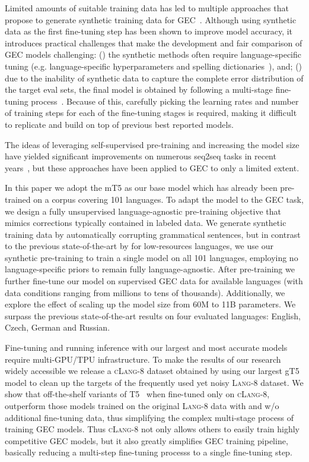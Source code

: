 \documentclass[11pt,a4paper]{article}
\newcommand{\GT}[0]{{gT5}\xspace}
\newcommand{\lang}[0]{{\scshape Lang-8}\xspace}
\newcommand{\clangg}[0]{{\scshape cLang-8}\xspace}
\begin{document}
Limited amounts of suitable training data has led to multiple approaches that propose to generate synthetic training data for GEC~\cite{madnani2012exploring,grundkiewicz2014wiked,grundkiewicz-etal-2019-neural,lichtarge-etal-2019-corpora,awasthi-etal-2019-parallel}.
Although using synthetic data as the first fine-tuning step has been shown to improve model accuracy, it introduces practical challenges that make the development and fair comparison of GEC models challenging: () the synthetic methods often require language-specific tuning (e.g. language-specific hyperparameters and spelling dictionaries~\cite{naplava}), and; () due to the inability of synthetic data to capture the complete error distribution of the target eval sets, the final model is obtained by following a multi-stage fine-tuning process~\cite{lichtarge-etal-2019-corpora,lichtarge-etal-2020-data,omelianchuk-etal-2020-gector}. 
Because of this, carefully picking the learning rates and number of training steps for each of the fine-tuning stages is required, making it difficult to replicate and build on top of previous best reported models.

The ideas of leveraging self-supervised pre-training and increasing the model size have yielded significant improvements on numerous seq2seq tasks in recent years~\cite{t5,mt5,BART,MASS,KERMIT,Bert2Bert}, but these approaches have been applied to GEC to only a limited extent.

In this paper we adopt the mT5 \citep{mt5} as our base model which has already been pre-trained on a corpus covering 101 languages.
To adapt the model to the GEC task, we design a fully unsupervised language-agnostic pre-training objective that mimics corrections typically contained in labeled data.
We generate synthetic training data by automatically corrupting grammatical sentences, but in contrast to the previous state-of-the-art by \citet{naplava} for low-resources languages, we use our synthetic pre-training to train a single model on all 101 languages, employing no language-specific priors to remain fully language-agnostic.  After pre-training we further fine-tune our model on supervised GEC data for available languages (with data conditions ranging from millions to tens of thousands).
Additionally, we explore the effect of scaling up the model size from 60M to 11B parameters. We surpass the previous state-of-the-art results on four evaluated languages: English, Czech, German and Russian.

Fine-tuning and running inference with our largest and most accurate models require multi-GPU/TPU infrastructure. To make the results of our research widely accessible we release a \clangg dataset obtained by using our largest \GT model to clean up the targets of the frequently used yet noisy \lang dataset. We show that off-the-shelf variants of T5~\cite{t5} when fine-tuned only on \clangg, outperform those models trained on the original \lang data with and w/o additional fine-tuning data, thus simplifying the complex multi-stage process of training GEC models. Thus \clangg not only allows others to easily train highly competitive GEC models, but it also greatly simplifies GEC training pipeline, basically reducing a multi-step fine-tuning processs to a single fine-tuning step.
\end{document}

